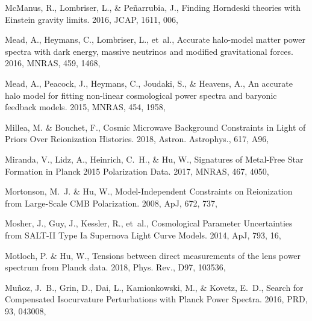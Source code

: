 \documentclass[longauth,traditabstract]{aa}
\def\apj{{ApJ}}
\def\mnras{{MNRAS}}
\def\prd{{PRD}}
\begin{document}
\begin{thebibliography}{379}
McManus, R., Lombriser, L., \& Pe{\~n}arrubia, J., {Finding Horndeski theories
  with Einstein gravity limits}. 2016, JCAP, 1611, 006, 

Mead, A., Heymans, C., Lombriser, L., {et~al.}, {Accurate halo-model matter
  power spectra with dark energy, massive neutrinos and modified gravitational
  forces}. 2016, \mnras, 459, 1468, 

Mead, A., Peacock, J., Heymans, C., Joudaki, S., \& Heavens, A., {An accurate
  halo model for fitting non-linear cosmological power spectra and baryonic
  feedback models}. 2015, \mnras, 454, 1958, 

Millea, M. \& Bouchet, F., {Cosmic Microwave Background Constraints in Light of
  Priors Over Reionization Histories}. 2018, Astron. Astrophys., 617, A96,

Miranda, V., Lidz, A., Heinrich, C.~H., \& Hu, W., Signatures of Metal-Free
  Star Formation in {{Planck}} 2015 {{Polarization Data}}. 2017, \mnras, 467,
  4050, 

Mortonson, M.~J. \& Hu, W., Model-Independent Constraints on Reionization from
  Large-Scale {{CMB}} Polarization. 2008, \apj, 672, 737, 

{Mosher}, J., {Guy}, J., {Kessler}, R., {et~al.}, {Cosmological Parameter
  Uncertainties from SALT-II Type Ia Supernova Light Curve Models}. 2014, \apj,
  793, 16, 

Motloch, P. \& Hu, W., {Tensions between direct measurements of the lens power
  spectrum from Planck data}. 2018, Phys. Rev., D97, 103536,

{Mu{\~n}oz}, J.~B., Grin, D., Dai, L., Kamionkowski, M., \& Kovetz, E.~D.,
  {Search for Compensated Isocurvature Perturbations with Planck Power
  Spectra}. 2016, \prd, 93, 043008, 


\end{thebibliography}
\end{document}
